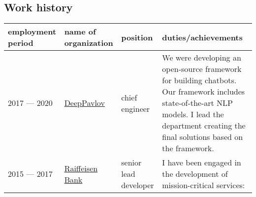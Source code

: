\hypertarget{work-history}{%
\subsection{Work history}\label{work-history}}

\begin{longtable}[]{@{}llll@{}}
\toprule
\begin{minipage}[b]{0.22\columnwidth}\raggedright
employment period\strut
\end{minipage} & \begin{minipage}[b]{0.22\columnwidth}\raggedright
name of organization\strut
\end{minipage} & \begin{minipage}[b]{0.22\columnwidth}\raggedright
position\strut
\end{minipage} & \begin{minipage}[b]{0.22\columnwidth}\raggedright
duties/achievements\strut
\end{minipage}\tabularnewline
\midrule
\endhead
\begin{minipage}[t]{0.22\columnwidth}\raggedright
2017 --- 2020\strut
\end{minipage} & \begin{minipage}[t]{0.22\columnwidth}\raggedright
\href{http://ipavlov.ai/}{DeepPavlov}\strut
\end{minipage} & \begin{minipage}[t]{0.22\columnwidth}\raggedright
chief engineer\strut
\end{minipage} & \begin{minipage}[t]{0.22\columnwidth}\raggedright
We were developing an open-source framework for building chatbots. Our
framework includes state-of-the-art NLP models. I lead the department
creating the final solutions based on the framework.\strut
\end{minipage}\tabularnewline
\begin{minipage}[t]{0.22\columnwidth}\raggedright
2015 --- 2017\strut
\end{minipage} & \begin{minipage}[t]{0.22\columnwidth}\raggedright
\href{https://www.raiffeisen.ru}{Raiffeisen Bank}\strut
\end{minipage} & \begin{minipage}[t]{0.22\columnwidth}\raggedright
senior lead developer\strut
\end{minipage} & \begin{minipage}[t]{0.22\columnwidth}\raggedright
I have been engaged in the development of mission-critical services:

\end{minipage}
\end{longtable}
